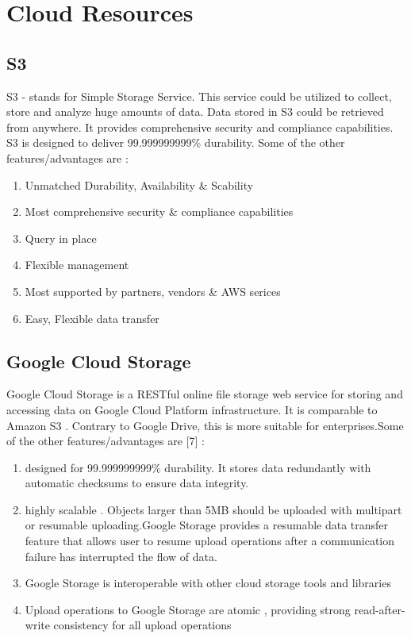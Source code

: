 \documentclass[journal]{hybrid-cloud}
\begin{document}
\appendices
\section{Cloud Resources}

\subsection{S3}

S3 - stands for Simple Storage Service. This service could be utilized to collect, store and analyze huge amounts of data. Data stored in S3 could be retrieved from anywhere. It provides comprehensive security and compliance capabilities. S3 is designed to deliver 99.999999999\% durability. Some of the other features/advantages are :

\begin{enumerate}
	\item Unmatched Durability, Availability \& Scability
	\item Most comprehensive security \& compliance capabilities
	\item Query in place
	\item Flexible management
	\item Most supported by partners, vendors \& AWS serices
	\item Easy, Flexible data transfer
\end{enumerate}

\subsection{Google Cloud Storage}

Google Cloud Storage is a RESTful online file storage web service for storing and accessing data on Google Cloud Platform infrastructure. It is comparable to Amazon S3 . Contrary to Google Drive, this is more suitable for enterprises.Some of the other features/advantages are [7] :

\begin{enumerate}
	\item designed for 99.999999999\% durability. It stores data redundantly with automatic checksums to ensure data integrity.
	\item highly scalable . Objects larger than 5MB should be uploaded with multipart or resumable uploading.Google Storage provides a resumable data transfer feature that allows user to resume upload operations after a communication failure has interrupted the flow of data.
	\item Google Storage is interoperable with other cloud storage tools and libraries
	\item  Upload operations to Google Storage are atomic , providing strong read-after-write consistency for all upload operations
\end{enumerate}
\end{document}
